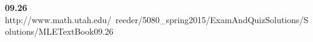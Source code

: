 { \bf 09.26 }
http://www.math.utah.edu/~reeder/5080_spring2015/ExamAndQuizSolutions/Solutions/MLETextBook09.26%
